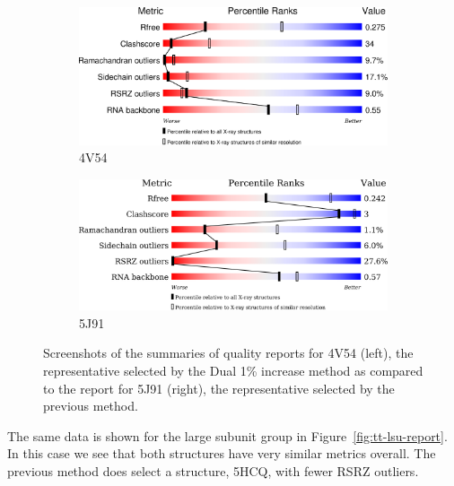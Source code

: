 \begin{figure}
  \begin{subfigure}[b]{0.5\textwidth}
    \includegraphics[width=\linewidth]{chapter-4/figs/quality-reports/4V54}
    \caption{4V54}
\label{fig:4V54-quality}
  \end{subfigure}
  \begin{subfigure}[b]{0.5\textwidth}
    \includegraphics[width=\linewidth]{chapter-4/figs/quality-reports/5J91}
    \caption{5J91}
\label{fig:5J91-quality}
  \end{subfigure}
  \caption{Screenshots of the summaries of quality reports for 4V54 (left), the
    representative selected by the Dual 1\% increase method as compared to the
    report for 5J91 (right), the representative selected by the previous
  method.}
\label{fig:ec-lsu-report}
\end{figure}

The same data is shown for the \TT{} large subunit group in
Figure~\ref{fig:tt-lsu-report}. In this case we see that both structures have
very similar metrics overall. The previous method does select a structure, 5HCQ,
with fewer RSRZ outliers.

